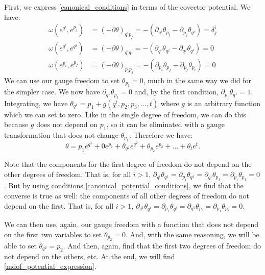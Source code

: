\documentclass[10pt,twocolumn, nofootinbib]{revtex4-2}
\begin{document}
First, we express \ref{canonical_conditions} in terms of the covector potential. We have:
\begin{equation}\label{canonical_potential_conditions}
\begin{aligned}
	\omega(e^{q^i}, e^{p_j}) &= (-\partial\theta)_{q^i p_j} = -(\partial_{q^i}\theta_{p_j} - \partial_{p_j}\theta_{q^i}) = \delta^i_j \\
	\omega(e^{q^i}, e^{q^j}) &= (-\partial\theta)_{q^i q^j} = -(\partial_{q^i}\theta_{q^j} - \partial_{q^j}\theta_{q^i}) = 0 \\
	\omega(e^{p_i}, e^{p_j}) &= (-\partial\theta)_{p_i p_j} = -(\partial_{p_i}\theta_{p_j} - \partial_{p_j}\theta_{p_i}) = 0
\end{aligned}
\end{equation}
We can use our gauge freedom to set $\theta_{p_1} = 0$, much in the same way we did for the simpler case. We now have $\partial_{q^1} \theta_{p_1} = 0$ and, by the first condition, $\partial_{p_1} \theta_{q^1} = 1$. Integrating, we have $\theta_{q^1} = p_1 + g(q^i, p_2, p_3, ..., t)$ where $g$ is an arbitrary function which we can set to zero. Like in the single degree of freedom, we can do this because $g$ does not depend on $p_1$, so it can be eliminated with a gauge transformation that does not change $\theta_{p_1}$. Therefore we have:
\begin{equation}
	\theta = p_1 e^{q^1} + 0 e^{p_1} + \theta_{q^2} e^{q^2} + \theta_{p_2} e^{p_2} + ... + \theta_{t} e^{t}.
\end{equation}

Note that the components for the first degree of freedom do not depend on the other degrees of freedom. That is, for all $i>1$, $\partial_{q^i} \theta_{q^1} = \partial_{p_i} \theta_{q^1} = \partial_{q^i} \theta_{p_1} = \partial_{p_i} \theta_{p_1} = 0$. But by using conditions \ref{canonical_potential_conditions}, we find that the converse is true as well: the components of all other degrees of freedom do not depend on the first. That is, for all $i>1$, $\partial_{q^1} \theta_{q^i} = \partial_{p_1} \theta_{q^i} = \partial_{q^1} \theta_{p_i} = \partial_{p_1} \theta_{p_i} = 0$.

We can then use, again, our gauge freedom with a function that does not depend on the first two variables to set $\theta_{p_2} = 0$. And, with the same reasoning, we will be able to set $\theta_{q^2} = p_2$. And then, again, find that the first two degrees of freedom do not depend on the others, etc. At the end, we will find \ref{mdof_potential_expression}.
\end{document}
